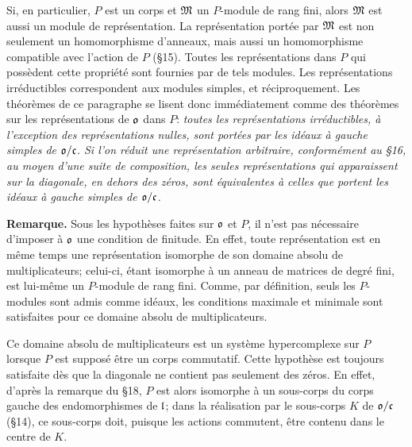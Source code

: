 Si, en particulier, $P$ est un corps et $\mathfrak{M}$ un $P$-module de rang fini, alors $\mathfrak{M}$ est aussi un module de représentation. La représentation portée par $\mathfrak{M}$ est non seulement un homomorphisme d'anneaux, mais aussi un homomorphisme compatible avec l'action de $P$ (\S{}15). Toutes les représentations dans $P$ qui possèdent cette propriété sont fournies par de tels modules. Les représentations irréductibles correspondent aux modules simples, et réciproquement. Les théorèmes de ce paragraphe se lisent donc immédiatement comme des théorèmes sur les représentations de $\mathfrak{o}$ dans $P$: \emph{toutes les représentations irréductibles, à l'exception des représentations nulles, sont portées par les idéaux à gauche simples de $\mathfrak{o}/\mathfrak{c}$. Si l'on réduit une représentation arbitraire, conformément au \S{}16, au moyen d'une suite de composition, les seules représentations qui apparaissent sur la diagonale, en dehors des zéros, sont équivalentes à celles que portent les idéaux à gauche simples de $\mathfrak{o}/\mathfrak{c}$.}

\textbf{Remarque.} Sous les hypothèses faites sur $\mathfrak{o}$ et $P$, il n'est pas nécessaire d'imposer à $\mathfrak{o}$ une condition de finitude. En effet, toute représentation est en même temps une représentation isomorphe de son domaine absolu de multiplicateurs; celui-ci, étant isomorphe à un anneau de matrices de degré fini, est lui-même un $P$-module de rang fini. Comme, par définition, seuls les $P$-modules sont admis comme idéaux, les conditions maximale et minimale sont satisfaites pour ce domaine absolu de multiplicateurs.

Ce domaine absolu de multiplicateurs est un système hypercomplexe sur $P$ lorsque $P$ est supposé être un corps commutatif. Cette hypothèse est toujours satisfaite dès que la diagonale ne contient pas seulement des zéros. En effet, d'après la remarque du \S{}18, $P$ est alors isomorphe à un sous-corps du corps gauche des endomorphismes de $\mathfrak{l}$; dans la réalisation par le sous-corps $K$ de $\mathfrak{o}/\mathfrak{c}$ (\S{}14), ce sous-corps doit, puisque les actions commutent, être contenu dans le centre de $K$.
